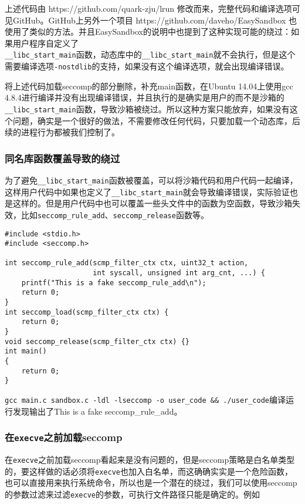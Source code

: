 上述代码由 https://github.com/quark-zju/lrun 修改而来，完整代码和编译选项可见GitHub。GitHub上另外一个项目 https://github.com/daveho/EasySandbox 也使用了类似的方法。并且EasySandbox的说明\cite{easy-sandbox-bypass}中也提到了这种实现可能的绕过：如果用户程序自定义了\\\texttt{\_\_libc\_start\_main}函数，动态库中的\texttt{\_\_libc\_start\_main}就不会执行，但是这个需要编译选项\texttt{-nostdlib}的支持，如果没有这个编译选项，就会出现编译错误。

将上述代码加载seccomp的部分删除，补充main函数，在Ubuntu 14.04上使用gcc 4.8.4进行编译并没有出现编译错误，并且执行的是确实是用户的而不是沙箱的\texttt{\_\_libc\_start\_main}函数，导致沙箱被绕过。所以这种方案只能放弃，如果没有这个问题，确实是一个很好的做法，不需要修改任何代码，只要加载一个动态库，后续的进程行为都被我们控制了。

\subsubsection{同名库函数覆盖导致的绕过}

为了避免\texttt{\_\_libc\_start\_main}函数被覆盖，可以将沙箱代码和用户代码一起编译，这样用户代码中如果也定义了\texttt{\_\_libc\_start\_main}就会导致编译错误，实际验证也是这样的。但是用户代码中也可以覆盖一些头文件中的函数为空函数，导致沙箱失效，比如\texttt{seccomp\_rule\_add}、\texttt{seccomp\_release}函数等。

\begin{verbatim}
#include <stdio.h>
#include <seccomp.h>

int seccomp_rule_add(scmp_filter_ctx ctx, uint32_t action, 
                     int syscall, unsigned int arg_cnt, ...) {
    printf("This is a fake seccomp_rule_add\n");
    return 0;
}
int seccomp_load(scmp_filter_ctx ctx) {
    return 0;
}
void seccomp_release(scmp_filter_ctx ctx) {}
int main()
{
    return 0;
}
\end{verbatim}

\texttt{gcc main.c sandbox.c -ldl -lseccomp -o user\_code \&\& ./user\_code}编译运行发现输出了This is a fake seccomp\_rule\_add。

\subsubsection{在\texttt{execve}之前加载seccomp}

在\texttt{execve}之前加载seccomp看起来是没有问题的，但是seccomp策略是白名单类型的，要这样做的话必须将\texttt{execve}也加入白名单，而这确确实实是一个危险函数，也可以直接用来执行系统命令，所以也是一个潜在的绕过，我们可以使用seccomp的参数过滤来过滤\texttt{execve}的参数，可执行文件路径只能是确定的。例如

